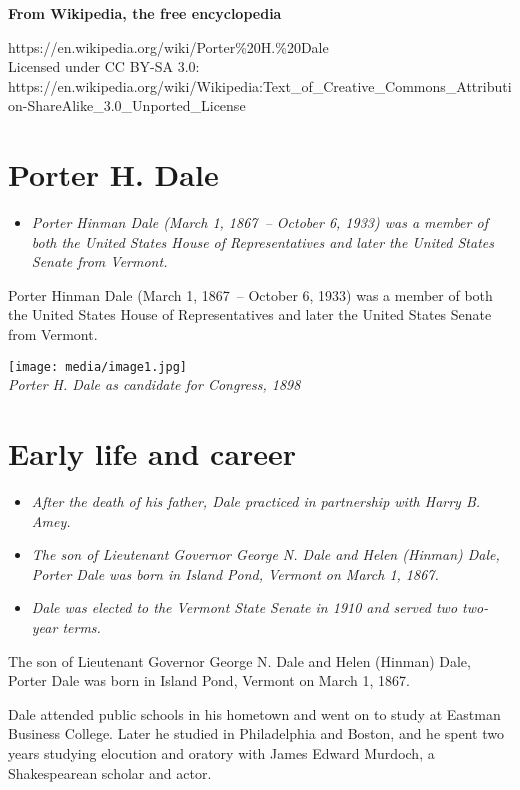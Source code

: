\textbf{From Wikipedia, the free encyclopedia}

https://en.wikipedia.org/wiki/Porter\%20H.\%20Dale\\
Licensed under CC BY-SA 3.0:\\
https://en.wikipedia.org/wiki/Wikipedia:Text\_of\_Creative\_Commons\_Attribution-ShareAlike\_3.0\_Unported\_License

\section{Porter H. Dale}\label{porter-h.-dale}

\begin{itemize}
\item
  \emph{Porter Hinman Dale (March 1, 1867~-- October 6, 1933) was a
  member of both the United States House of Representatives and later
  the United States Senate from Vermont.}
\end{itemize}

Porter Hinman Dale (March 1, 1867~-- October 6, 1933) was a member of
both the United States House of Representatives and later the United
States Senate from Vermont.

\texttt{[image: media/image1.jpg]}\\
\emph{Porter H. Dale as candidate for Congress, 1898}

\section{Early life and career}\label{early-life-and-career}

\begin{itemize}
\item
  \emph{After the death of his father, Dale practiced in partnership
  with Harry B. Amey.}
\item
  \emph{The son of Lieutenant Governor George N. Dale and Helen (Hinman)
  Dale, Porter Dale was born in Island Pond, Vermont on March 1, 1867.}
\item
  \emph{Dale was elected to the Vermont State Senate in 1910 and served
  two two-year terms.}
\end{itemize}

The son of Lieutenant Governor George N. Dale and Helen (Hinman) Dale,
Porter Dale was born in Island Pond, Vermont on March 1, 1867.

Dale attended public schools in his hometown and went on to study at
Eastman Business College. Later he studied in Philadelphia and Boston,
and he spent two years studying elocution and oratory with James Edward
Murdoch, a Shakespearean scholar and actor.

